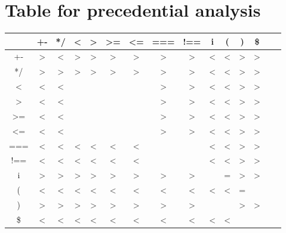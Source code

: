 \documentclass{article}
\begin{document}
\section{Table for precedential analysis}
\begin{center}

\begin{tabular}{ |c|c|c|c|c|c|c|c|c|c|c|c|c|c|c| }
 \hline
  & +- & */ & < & > & >= & <= & === & !== & i & ( & ) & \$ \\ 
 \hline
 +- & > & < & > & > & > & > & > & > & < & < & > & > \\
 \hline
  */ & > & > & > & > & > & > & > & > & < & < & > & > \\
 \hline
 < & < & < &  &  &  &  & >  & > & < & < & > & >\\
 \hline
 > & < & < &  &  &  &  & >  & > & < & < & > & >\\
 \hline
 >= & < & < &  &  &  &  & >  & > & < & < & > & > \\
 \hline
 <= & < & < &  &  &  &  & >  & > & < & < & > & >\\
 \hline
 === & < & < & <  & <  & <  & <  &  & & < & < & > & > \\
 \hline
 !== & < & < & < & < & < & < &  & & < & < & > & > \\
 \hline
 i & > & > & > & > & >  & >  & >  & > & & = & > & > \\
 \hline
 ( & < & < & < & <  & <  & <  & <  & < & < & <  & = & \\
 \hline
 ) & > & > & > & >  & >  & >  & >  & > &  &  & > & > \\
 \hline
 \$ & < & < & < & <  & <  & <  & <  & < & < & <  &  & \\
 \hline
\end{tabular}



\end{center}
\end{document}
